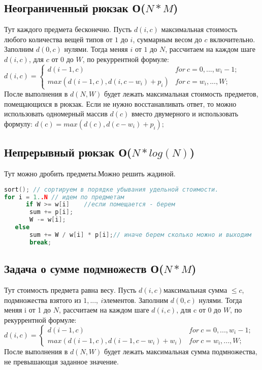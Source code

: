 \subsection{Неограниченный рюкзак О($N*M$)}
Тут каждого предмета бесконечно.\newline
Пусть $d(i,c)$ максимальная стоимость любого количества вещей типов от $1$ до $i$, суммарным весом до $c$ включительно.
Заполним $d(0,c)$ нулями.
Тогда меняя $i$ от $1$ до $N$, рассчитаем на каждом шаге $d(i,c)$, для $c$ от $0$ до $W$, по рекуррентной формуле:\newline
$d(i,c) = \begin{cases}  d(i - 1, c) & for\ c = 0, ..., w_i - 1; \\  max(d(i - 1, c), d(i, c - w_i) + p_i) & for\ c = w_i, ..., W;  \end{cases}$\newline
После выполнения в $d(N,W)$ будет лежать максимальная стоимость предметов, помещающихся в рюкзак.
Если не нужно восстанавливать ответ, то можно использовать одномерный массив $d(c)$ вместо двумерного и использовать формулу:
$d(c) = max(d(c), d(c - w_i) + p_i);$
\subsection{Непрерывный рюкзак О($N*log(N)$)}
Тут можно дробить предметы.\newline Можно решить жадиной.
\begin{lstlisting}[language = C++]
sort(); // сортируем в порядке убывания удельной стоимости.
for i = 1..N // идем по предметам            
      if W >= w[i]    //если помещается - берем
       sum += p[i];
       W -= w[i];
   else
       sum += W / w[i] * p[i];// иначе берем сколько можно и выходим
       break;
\end{lstlisting}
\subsection{Задача о сумме подмножеств О($N*M$)}
Тут стоимость предмета равна весу.\newline
Пусть $d(i,c) $максимальная сумма $ \le c$, подмножества взятого из $1, ...,\ i $элементов.
Заполним $d(0,c)$ нулями.
Тогда меняя i от 1 до $N$, рассчитаем на каждом шаге $d(i,c)$, для c от 0 до $W$, по рекуррентной формуле:\newline
$d(i,c) = \begin{cases}  d(i - 1, c) & for\ c = 0, ..., w_i - 1; \\  max(d(i - 1, c), d(i - 1, c - w_i) + w_i) & for\ c = w_i, ..., W;  \end{cases}$\newline
После выполнения в $d(N,W)$ будет лежать максимальная сумма подмножества, не превышающая заданное значение.
